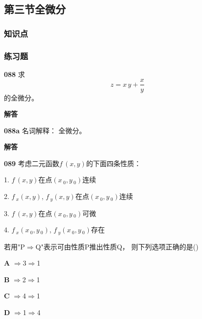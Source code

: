 \documentclass[a4paper,10pt]{article} %
\begin{document}


\textheight


\newpage
\subsection{第三节\quad 全微分}
\subsubsection{知识点}
\subsubsection{练习题}
\par\noindent \textbf{088} \quad 求
$$z=x\,y+\frac{x}{y}$$
的全微分。
\par\noindent \textbf{ 解答}





\textheight


\par\noindent \textbf{088a} \quad 名词解释： 全微分。
\par\noindent \textbf{ 解答}





\textheight


\par\noindent \textbf{089} \quad 考虑二元函数$f\,(x,y)$的下面四条性质：\par
1. $f\,(x,y)$在点$(x\,_0,y\,_0)$连续\par
2. $f\,_x(x,y)$, $f\,_y(x,y)$在点$(x\,_0,y\,_0)$连续\par
3. $f\,(x,y)$在点$(x\,_0,y\,_0)$可微\par
4. $f\,_x(x\,_0,y\,_0)$, $f\,_y(x\,_0,y\,_0)$存在\par
若用"P$\Rightarrow$Q"表示可由性质P推出性质Q， 则下列选项正确的是\hfill (\quad\quad\quad)
\par\noindent \textbf{A} $\Rightarrow$3$\Rightarrow$1
\par\noindent \textbf{B} $\Rightarrow$2$\Rightarrow$1
\par\noindent \textbf{C} $\Rightarrow$4$\Rightarrow$1
\par\noindent \textbf{D} $\Rightarrow$1$\Rightarrow$4
\end{document}
